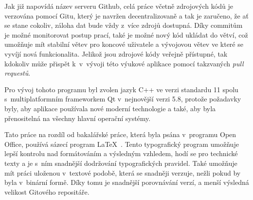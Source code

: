 Jak již napovídá název serveru Github, celá práce včetně zdrojových kódů je verzována pomocí Gitu, který je navržen decentralizovaně a tak je zaručeno, že ať se stane cokoliv, záloha dat bude vždy z~více zdrojů dostupná. Díky commitům je možné monitorovat postup prací, také je možné nový kód ukládat do větví, což umožňuje mít stabilní větev pro koncové uživatele a vývojovou větev ve které se vyvíjí nová funkcionalita. Jelikož jsou zdrojové kódy veřejně přístupné, tak kdokoliv může přispět k~v~vývoji této výukové aplikace pomocí takzvaných \textit{pull requestů}.

Pro vývoj tohoto programu byl zvolen jazyk C++ ve verzi standardu 11 spolu s~multiplatformním frameworkem Qt v~nejnovější verzi 5.8, protože požadavky byly, aby aplikace používala nové moderní technologie a také, aby byla přenositelná na všechny hlavní operační systémy.

Tato práce na rozdíl od bakalářské práce, která byla psána v~programu Open Office, používá sázecí program \LaTeX\ \cite{latex}. Tento typografický program umožňuje lepší kontrolu nad formátováním a výsledným vzhledem, hodí se pro technické texty a je s~ním snadnější dodržování typografických pravidel. Také umožňuje mít práci uloženou v~textové podobě, která se snadněji verzuje, nežli pokud by byla v~binární formě. Díky tomu je snadnější porovnávání verzí, a menší výsledná velikost Gitového repositáře.




